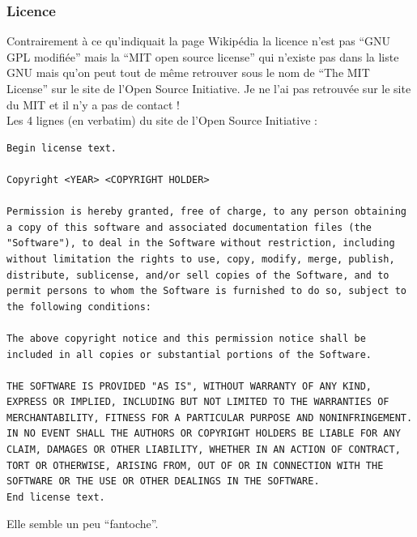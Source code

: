 
\subsubsection{Licence}
Contrairement à ce qu'indiquait la page Wikipédia la licence n'est pas \enquote{GNU GPL
modifiée} mais la \enquote{MIT open source license} qui n'existe pas dans la liste GNU
\cite{ref2} mais qu'on peut tout de même retrouver sous le nom de \enquote{The MIT
License} sur le site de l'Open Source Initiative. Je ne l'ai pas retrouvée sur le
site du MIT et il n'y a pas de contact !\\

Les 4 lignes (en verbatim) du site de l'Open Source Initiative :
\begin{verbatim}
Begin license text.

Copyright <YEAR> <COPYRIGHT HOLDER>

Permission is hereby granted, free of charge, to any person obtaining a copy of this software and associated documentation files (the "Software"), to deal in the Software without restriction, including without limitation the rights to use, copy, modify, merge, publish, distribute, sublicense, and/or sell copies of the Software, and to permit persons to whom the Software is furnished to do so, subject to the following conditions:

The above copyright notice and this permission notice shall be included in all copies or substantial portions of the Software.

THE SOFTWARE IS PROVIDED "AS IS", WITHOUT WARRANTY OF ANY KIND, EXPRESS OR IMPLIED, INCLUDING BUT NOT LIMITED TO THE WARRANTIES OF MERCHANTABILITY, FITNESS FOR A PARTICULAR PURPOSE AND NONINFRINGEMENT. IN NO EVENT SHALL THE AUTHORS OR COPYRIGHT HOLDERS BE LIABLE FOR ANY CLAIM, DAMAGES OR OTHER LIABILITY, WHETHER IN AN ACTION OF CONTRACT, TORT OR OTHERWISE, ARISING FROM, OUT OF OR IN CONNECTION WITH THE SOFTWARE OR THE USE OR OTHER DEALINGS IN THE SOFTWARE.
End license text. 
\end{verbatim}

Elle semble un peu \enquote{fantoche}.\\

